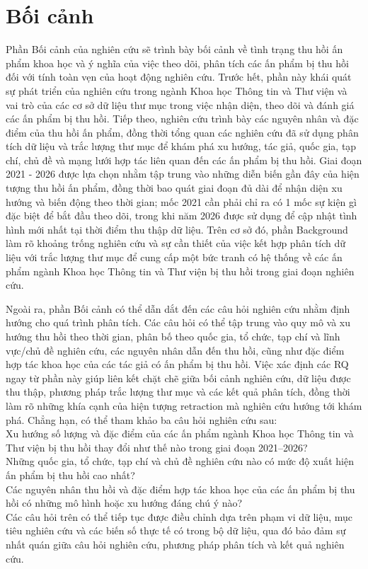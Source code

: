 \section{Bối cảnh}

Phần Bối cảnh của nghiên cứu sẽ trình bày bối cảnh về tình trạng thu hồi ấn phẩm khoa học và ý nghĩa của việc theo dõi, phân tích các ấn phẩm bị thu hồi đối với tính toàn vẹn của hoạt động nghiên cứu. Trước hết, phần này khái quát sự phát triển của nghiên cứu trong ngành Khoa học Thông tin và Thư viện và vai trò của các cơ sở dữ liệu thư mục trong việc nhận diện, theo dõi và đánh giá các ấn phẩm bị thu hồi. Tiếp theo, nghiên cứu trình bày các nguyên nhân và đặc điểm của thu hồi ấn phẩm, đồng thời tổng quan các nghiên cứu đã sử dụng phân tích dữ liệu và trắc lượng thư mục để khám phá xu hướng, tác giả, quốc gia, tạp chí, chủ đề và mạng lưới hợp tác liên quan đến các ấn phẩm bị thu hồi. Giai đoạn 2021 - 2026 được lựa chọn nhằm tập trung vào những diễn biến gần đây của hiện tượng thu hồi ấn phẩm, đồng thời bao quát giai đoạn đủ dài để nhận diện xu hướng và biến động theo thời gian; mốc 2021 cần phải chỉ ra có 1 mốc sự kiện gì đặc biệt để bắt đầu theo dõi, trong khi năm 2026 được sử dụng để cập nhật tình hình mới nhất tại thời điểm thu thập dữ liệu. Trên cơ sở đó, phần Background làm rõ khoảng trống nghiên cứu và sự cần thiết của việc kết hợp phân tích dữ liệu với trắc lượng thư mục để cung cấp một bức tranh có hệ thống về các ấn phẩm ngành Khoa học Thông tin và Thư viện bị thu hồi trong giai đoạn nghiên cứu.

Ngoài ra, phần Bối cảnh có thể dẫn dắt đến các câu hỏi nghiên cứu nhằm định hướng cho quá trình phân tích. Các câu hỏi có thể tập trung vào quy mô và xu hướng thu hồi theo thời gian, phân bố theo quốc gia, tổ chức, tạp chí và lĩnh vực/chủ đề nghiên cứu, các nguyên nhân dẫn đến thu hồi, cũng như đặc điểm hợp tác khoa học của các tác giả có ấn phẩm bị thu hồi. Việc xác định các RQ ngay từ phần này giúp liên kết chặt chẽ giữa bối cảnh nghiên cứu, dữ liệu được thu thập, phương pháp trắc lượng thư mục và các kết quả phân tích, đồng thời làm rõ những khía cạnh của hiện tượng retraction mà nghiên cứu hướng tới khám phá. Chẳng hạn, có thể tham khảo ba câu hỏi nghiên cứu sau:\\[3pt]
 Xu hướng số lượng và đặc điểm của các ấn phẩm ngành Khoa học Thông tin và Thư viện bị thu hồi thay đổi như thế nào trong giai đoạn 2021--2026? \\[3pt]
 Những quốc gia, tổ chức, tạp chí và chủ đề nghiên cứu nào có mức độ xuất hiện ấn phẩm bị thu hồi cao nhất? \\[3pt]
 Các nguyên nhân thu hồi và đặc điểm hợp tác khoa học của các ấn phẩm bị thu hồi có những mô hình hoặc xu hướng đáng chú ý nào? \\[3pt]
Các câu hỏi trên có thể tiếp tục được điều chỉnh dựa trên phạm vi dữ liệu, mục tiêu nghiên cứu và các biến số thực tế có trong bộ dữ liệu, qua đó bảo đảm sự nhất quán giữa câu hỏi nghiên cứu, phương pháp phân tích và kết quả nghiên cứu.